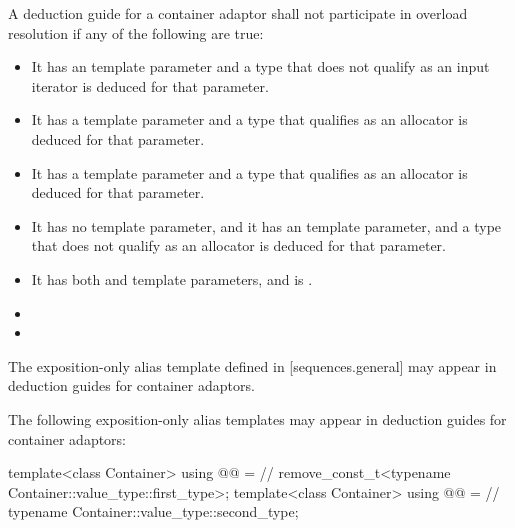 \pnum
A deduction guide for a container adaptor shall not participate in overload resolution if any of the following are true:
\begin{itemize}
\item It has an  template parameter and a type that does not qualify as an input iterator is deduced for that parameter.
\item It has a  template parameter and a type that qualifies as an allocator is deduced for that parameter.
\item It has a  template parameter and a type that qualifies as an allocator is deduced for that parameter.
\item It has no  template parameter, and it has an  template parameter, and a type that does not qualify as an allocator is deduced for that parameter.
\item It has both  and  template parameters, and  is .
\item {}
\item {}
\end{itemize}

\pnum
The exposition-only alias template  defined in
[sequences.general] may appear in
deduction guides for container adaptors.

\begin{addedblock}
\pnum
The following exposition-only alias templates may appear in deduction guides
for container adaptors:

\begin{codeblock}
  template<class Container>
    using @@ =                                // \expos
      remove_const_t<typename Container::value_type::first_type>;
  template<class Container>
    using @@ =                             // \expos
      typename Container::value_type::second_type;
\end{codeblock}
\end{addedblock}

